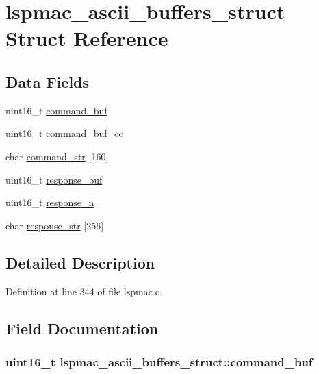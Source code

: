 \hypertarget{structlspmac__ascii__buffers__struct}{\section{lspmac\-\_\-ascii\-\_\-buffers\-\_\-struct Struct Reference}
\label{structlspmac__ascii__buffers__struct}
}
\subsection*{Data Fields}
\begin{DoxyCompactItemize}
\item 
uint16\-\_\-t \hyperlink{structlspmac__ascii__buffers__struct_ad92fe7e16e5e67ec4c115a6b86890faa}{command\-\_\-buf}
\item 
uint16\-\_\-t \hyperlink{structlspmac__ascii__buffers__struct_a4d11efeb1eef407d811d3f9b774adc54}{command\-\_\-buf\-\_\-cc}
\item 
char \hyperlink{structlspmac__ascii__buffers__struct_abe6a433dd9be4781dbf7e31d16484a4b}{command\-\_\-str} \mbox{[}160\mbox{]}
\item 
uint16\-\_\-t \hyperlink{structlspmac__ascii__buffers__struct_ae1d37cf9568478c9d8dad540ce77183c}{response\-\_\-buf}
\item 
uint16\-\_\-t \hyperlink{structlspmac__ascii__buffers__struct_a97c2fdd21eec29c2cba993e361c3c069}{response\-\_\-n}
\item 
char \hyperlink{structlspmac__ascii__buffers__struct_a32c4baecf20143eb71d348b6b5679039}{response\-\_\-str} \mbox{[}256\mbox{]}
\end{DoxyCompactItemize}


\subsection{Detailed Description}


Definition at line 344 of file lspmac.\-c.



\subsection{Field Documentation}
\hypertarget{structlspmac__ascii__buffers__struct_ad92fe7e16e5e67ec4c115a6b86890faa}{
\subsubsection[{command\-\_\-buf}]{\setlength{\rightskip}{0pt plus 5cm}uint16\-\_\-t lspmac\-\_\-ascii\-\_\-buffers\-\_\-struct\-::command\-\_\-buf}}\label{structlspmac__ascii__buffers__struct_ad92fe7e16e5e67ec4c115a6b86890faa}


